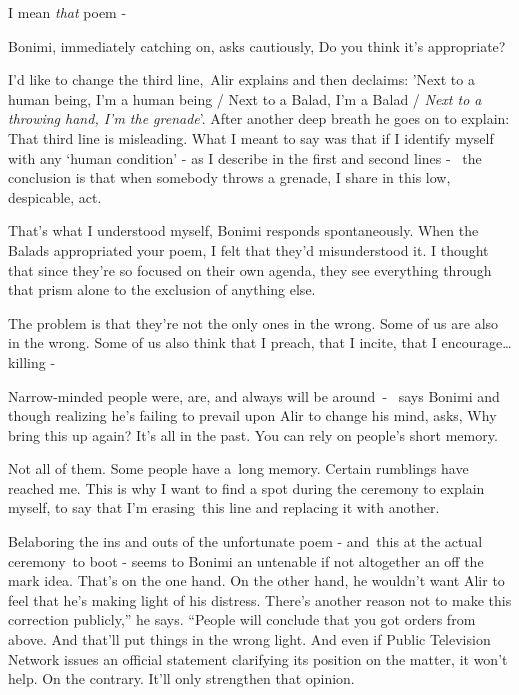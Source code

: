 \documentclass[twoside,11pt]{book}
\begin{document}
{\textquotedbl}I mean \textit{that} poem -{\textquotedbl} 

Bonimi, immediately catching on, asks cautiously, {\textquotedbl}Do you think it's appropriate?{\textquotedbl} 

{\textquotedbl}I'd like to change the third line,{\textquotedbl}\ Alir explains and then declaims: {\textquotedbl}'Next
to a human being, I'm a human being / Next to a Balad, I'm a Balad / \textit{Next to a throwing hand, I'm the
grenade}{}'.{\textquotedbl} After another deep breath he goes on to explain: {\textquotedbl}That third line is
misleading. What I meant to say was that if I identify myself with any `human condition' - as I describe in the first
and second lines -~ the conclusion is that when somebody throws a grenade, I share in this low, despicable, act.
{\textquotedbl} 

{\textquotedbl}That's what I understood myself,{\textquotedbl} Bonimi responds spontaneously. {\textquotedbl}When the
Balads appropriated your poem, I felt that they'd misunderstood it. I thought that since they're so focused on their
own agenda, they see everything through that prism alone to the exclusion of anything else.{\textquotedbl} 

{\textquotedbl}The problem is that they're not the only ones in the wrong. Some of us are also in the wrong. Some of us
also think that I preach, that I incite, that I encourage{\dots} killing -{\textquotedbl} 

{\textquotedbl}Narrow-minded people were, are, and always will be around\ {}- {\textquotedbl}\ says Bonimi and though
realizing he's failing to prevail upon Alir to change his mind, asks, {\textquotedbl}Why bring this up again? It's all
in the past. You can rely on people's short memory.{\textquotedbl} 

{\textquotedbl}Not all of them. Some people have a~long memory. Certain rumblings have reached me. This is why I want to
find a spot during the ceremony to explain myself, to say that I'm erasing~this line and replacing it with
another.{\textquotedbl}\ 

Belaboring the ins and outs of the unfortunate poem -  and\ this at the actual ceremony\ to boot - seems to Bonimi an
untenable if not altogether an off the mark idea. That's on the one hand. On the other hand, he wouldn't want Alir to
feel that he's making light of his distress. {\textquotedbl}There's another reason not to make this correction
publicly,'' he says. ``People will conclude that you got orders from above. And that{}'ll put things in the wrong
light. And even if Public Television Network issues an official statement clarifying its position on the matter, it
won't help. On the contrary. It'll only strengthen that opinion.{\textquotedbl} 
\end{document}
